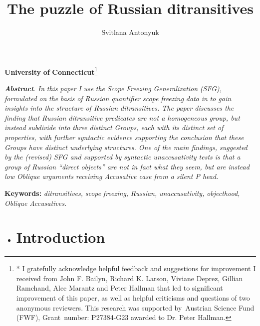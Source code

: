 \documentclass[output=paper,modfonts, nonflat]{langsci/langscibook}
\author{Svitlana Antonyuk	\affiliation{}}
\title{The puzzle of Russian ditransitives}
\begin{document}
\maketitle
 
 

 \textbf{University} \textbf{of} \textbf{Connecticut}\footnote{* I gratefully acknowledge helpful feedback and suggestions for improvement I received from John F. Bailyn, Richard K. Larson, Viviane Deprez, Gillian Ramchand, Alec Marantz and Peter Hallman that led to significant improvement of this paper, as well as helpful criticisms and questions of two anonymous reviewers. This research was supported by~Austrian Science Fund (FWF), Grant~number: P27384-G23 awarded to Dr. Peter Hallman.}

\textbf{\textit{Abstract}}. \textit{In} \textit{this} \textit{paper} \textit{I} \textit{use} \textit{the} \textit{Scope} \textit{Freezing} \textit{Generalization} \textit{(SFG),} \textit{formulated} \textit{on} \textit{the} \textit{basis} \textit{of} \textit{Russian} \textit{quantifier} \textit{scope} \textit{freezing} \textit{data} \textit{in} \textit{\citet{Antonyuk2015} to gain insights into the structure of Russian ditransitives. The paper discusses the finding that Russian ditransitive predicates are not a homogeneous group, but instead subdivide into three distinct Groups, each with its distinct set of properties, with further syntactic evidence supporting the conclusion that these Groups have distinct underlying structures. One of the main findings, suggested by the (revised) SFG and supported by syntactic unaccusativity tests is that a group of Russian “direct objects” are not in fact what they seem, but are instead low Oblique arguments receiving Accusative case from a silent P head.}

\textbf{Keywords:} \textit{ditransitives,} \textit{scope} \textit{freezing,} \textit{Russian,} \textit{unaccusativity,} \textit{objecthood,} \textit{Oblique} \textit{Accusatives.}

\begin{itemize}
\item \section{Introduction}
\end{itemize}
\end{document}
